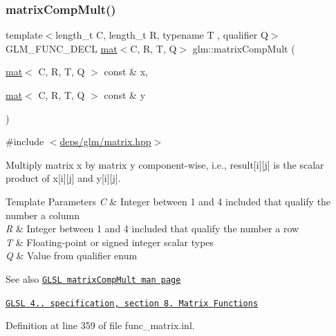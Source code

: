 \subsubsection{\texorpdfstring{matrix\+Comp\+Mult()}{matrixCompMult()}}
{\footnotesize\ttfamily template$<$length\+\_\+t C, length\+\_\+t R, typename T , qualifier Q$>$ \\
G\+L\+M\+\_\+\+F\+U\+N\+C\+\_\+\+D\+E\+CL \hyperlink{structglm_1_1mat}{mat}$<$C, R, T, Q$>$ glm\+::matrix\+Comp\+Mult (\begin{DoxyParamCaption}\item[{\hyperlink{structglm_1_1mat}{mat}$<$ C, R, T, Q $>$ const \&}]{x,  }\item[{\hyperlink{structglm_1_1mat}{mat}$<$ C, R, T, Q $>$ const \&}]{y }\end{DoxyParamCaption})}



{\ttfamily \#include $<$\hyperlink{matrix_8hpp}{deps/glm/matrix.\+hpp}$>$}

Multiply matrix x by matrix y component-\/wise, i.\+e., result\mbox{[}i\mbox{]}\mbox{[}j\mbox{]} is the scalar product of x\mbox{[}i\mbox{]}\mbox{[}j\mbox{]} and y\mbox{[}i\mbox{]}\mbox{[}j\mbox{]}.


\begin{DoxyTemplParams}{Template Parameters}
{\em C} & Integer between 1 and 4 included that qualify the number a column \\
\hline
{\em R} & Integer between 1 and 4 included that qualify the number a row \\
\hline
{\em T} & Floating-\/point or signed integer scalar types \\
\hline
{\em Q} & Value from qualifier enum\\
\hline
\end{DoxyTemplParams}
\begin{DoxySeeAlso}{See also}
\href{http://www.opengl.org/sdk/docs/manglsl/xhtml/matrixCompMult.xml}{\tt G\+L\+SL matrix\+Comp\+Mult man page} 

\href{http://www.opengl.org/registry/doc/GLSLangSpec.4.20.8.pdf}{\tt G\+L\+SL 4.. specification, section 8. Matrix Functions} 
\end{DoxySeeAlso}


Definition at line 359 of file func\+\_\+matrix.\+inl.

\mbox{\label{group__core__func__matrix_gac29fb7bae75a8e4c1b74cbbf85520e50}} 
